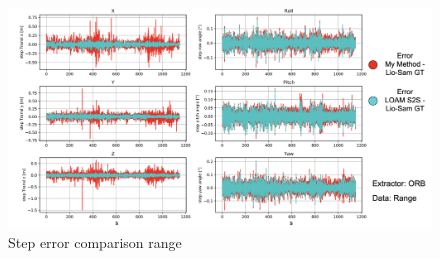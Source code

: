 {    \begin{figure}[ht]
        \centering
        \includegraphics[scale = 0.25]{images/comparison_appendix/step_error_range.png}
        \caption{Step error comparison range}
        \label{fig:step_error_comparison_range}
    \end{figure}
    \clearpage
}

